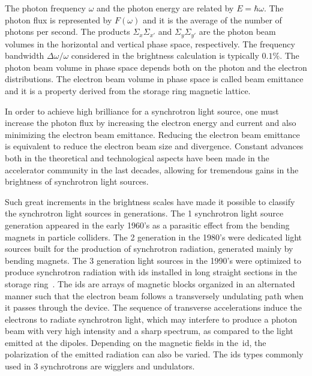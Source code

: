 The photon frequency $\omega$ and the photon energy are related by $E = \hbar \omega$. The photon flux is represented by $F(\omega)$ and it is the average of the number of photons per second. The products $\Sigma_x \Sigma_{x'}$ and $\Sigma_y\Sigma_{y'}$ are the photon beam volumes in the horizontal and vertical phase space, respectively. The frequency bandwidth $\Delta \omega/\omega$ considered in the brightness calculation is typically $0.1\%$. The photon beam volume in phase space depends both on the photon and the electron distributions. The electron beam volume in phase space is called beam emittance and it is a property derived from the storage ring magnetic lattice.

In order to achieve high brilliance for a synchrotron light source, one must increase the photon flux by increasing the electron energy and current and also minimizing the electron beam emittance. Reducing the electron beam emittance is equivalent to reduce the electron beam size and divergence. Constant advances both in the theoretical and technological aspects have been made in the accelerator community in the last decades, allowing for tremendous gains in the brightness of synchrotron light sources. 

Such great increments in the brightness scales have made it possible to classify the synchrotron light sources in generations. The 1 synchrotron light source generation appeared in the early 1960's as a parasitic effect from the bending magnets in particle colliders. The 2 generation in the 1980's were dedicated light sources built for the production of synchrotron radiation, generated mainly by bending magnets. The 3 generation light sources in the 1990's were optimized to produce synchrotron radiation with \glspl{id} installed in long straight sections in the storage ring~\cite{liu2017}. The \glspl{id} are arrays of magnetic blocks organized in an alternated manner such that the electron beam follows a transversely undulating path when it passes through the device. The sequence of transverse accelerations induce the electrons to radiate synchrotron light, which may interfere to produce a photon beam with very high intensity and a sharp spectrum, as compared to the light emitted at the dipoles. Depending on the magnetic fields in the~\gls{id}, the polarization of the emitted radiation can also be varied. The \glspl{id} types commonly used in 3 synchrotrons are wigglers and undulators.

